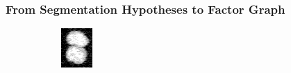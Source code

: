 \begin{frame}
    \frametitle{From Segmentation Hypotheses to Factor Graph}
    \begin{minipage}[t][0.4\textheight][t]{\textwidth}%
        \begin{figure}
            \centering
            \begin{subfigure}[t]{0.23\textwidth}
                \centering
                \includegraphics[width=\textwidth]{images/joint/overseg/75/02/raw_contrast.png}
            \end{subfigure}%
            \hfill%
            \begin{subfigure}[t]{0.23\textwidth}
                \centering
\end{subfigure}
\end{figure}
\end{minipage}
\end{frame}

